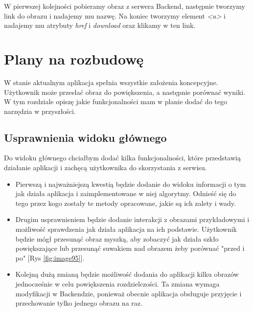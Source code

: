 W pierwszej kolejności pobieramy obraz z serwera Backend, następnie tworzymy link do obrazu i nadajemy mu nazwę. Na koniec tworzymy element \textit{<a>} i nadajemy mu atrybuty \textit{href} i \textit{download} oraz klikamy w ten link.


\section{Plany na rozbudowę} \label{sec:plans}

W stanie aktualnym aplikacja spełnia wszystkie założenia koncepcyjne. Użytkownik może przesłać obraz do powiększenia, a następnie porównać wyniki. W tym rozdziale opiszę jakie funkcjonalności mam w planie dodać do tego narzędzia w przyszłości.

\subsection*{Usprawnienia widoku głównego}

Do widoku głównego chciałbym dodać kilka funkcjonalności, które przedstawią działanie aplikacji i zachęcą użytkownika do skorzystania z serwisu.

\begin{itemize}
    \item Pierwszą i najważniejszą kwestią będzie dodanie do widoku informacji o tym jak działa aplikacja i zaimplementowane w niej algorytmy. Odnieść się do tego przez kogo zostały te metody opracowane, jakie są ich zalety i wady.
    \item Drugim usprawnieniem będzie dodanie interakcji z obrazami przykładowymi i możliwość sprawdzenia jak działa aplikacja na ich podstawie. Użytkownik będzie mógł przesunąć obraz myszką, aby zobaczyć jak działa szkło powiększające lub przesunąć suwakiem nad obrazem żeby porównać "przed i po" [Rys \ref{fig:image95}].
    \item Kolejną dużą zmianą będzie możliwość dodania do aplikacji kilku obrazów jednocześnie w celu powiększenia rozdzielczości. Ta zmiana wymaga modyfikacji w Backendzie, ponieważ obecnie aplikacja obsługuje przyjęcie i przechowanie tylko jednego obrazu na raz.
\end{itemize}

